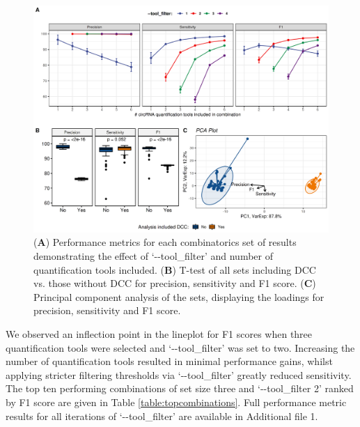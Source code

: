 \documentclass{bmcart}
\begin{document}
\begin{figure}[h!]
    \centering
    \includegraphics[width=12.25cm]{figure6.png}
    \vspace{-10mm}
    \caption{(\textbf{A}) Performance metrics for each combinatorics set of results demonstrating the effect of `-{}-tool\_filter' and number of quantification tools included. (\textbf{B}) T-test of all sets including DCC vs. those without DCC for precision, sensitivity and F1 score. (\textbf{C}) Principal component analysis of the sets, displaying the loadings for precision, sensitivity and F1 score.}
    \label{fig:6}
\end{figure}

We observed an inflection point in the lineplot for F1 scores when three quantification tools were selected and `-{}-tool\_filter' was set to two. Increasing the number of quantification tools resulted in minimal performance gains, whilst applying stricter filtering thresholds via `-{}-tool\_filter' greatly reduced sensitivity. The top ten performing combinations of set size three and `-{}-tool\_filter 2' ranked by F1 score are given in Table \ref{table:topcombinations}. Full performance metric results for all iterations of `-{}-tool\_filter' are available in Additional file 1.
\par 
\end{document}
